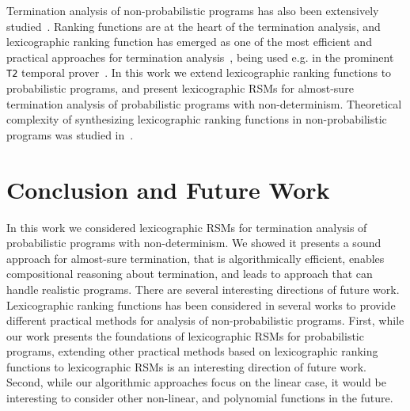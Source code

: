 Termination analysis of non-probabilistic programs has also been extensively 
studied~\cite{PR04:transition-invariants, 
CPR06:terminator,DBLP:conf/cav/BradleyMS05,DBLP:conf/tacas/ColonS01, 
DBLP:conf/vmcai/PodelskiR04,DBLP:conf/pods/SohnG91,BMS05b,LJB01,KSTW10:compositional-transition-invariants,
 CPR11:termination-cacm}.
Ranking functions are at the heart of the termination analysis, and lexicographic 
ranking function has emerged as one of the most efficient and practical approaches
for termination 
analysis~\cite{DBLP:conf/cav/BradleyMS05,CSZ13,ADFG10:lexicographic,GMR15:rank-extremal},
being used e.g. in 
the prominent \texttt{T2} temporal prover~\cite{BCIKP16:T2}.
In this work we extend lexicographic ranking functions to probabilistic 
programs,
and present lexicographic RSMs for almost-sure termination analysis of probabilistic programs
with non-determinism. Theoretical complexity of synthesizing lexicographic 
ranking functions in non-probabilistic programs was studied 
in~\cite{BG13:integer-ranking,BG15:lexicographic-complexity}.


\vspace{-0.5em}
\section{Conclusion and Future Work}
\vspace{-0.5em}
In this work we considered lexicographic RSMs for termination analysis of probabilistic
programs with non-determinism.
We showed it presents a sound approach for almost-sure termination, that is
algorithmically efficient, enables compositional reasoning about termination, 
and leads to approach that can handle realistic programs.
There are several interesting directions of future work.
Lexicographic ranking functions has been considered in several works to 
provide different practical methods for analysis of non-probabilistic programs.
First, while our work presents the foundations of lexicographic RSMs for probabilistic 
programs, extending other practical methods based on lexicographic ranking 
functions to 
lexicographic RSMs is an interesting direction of future work.
Second, while our algorithmic approaches focus on the linear case, it would be interesting
to consider other non-linear, and polynomial functions in the future.





